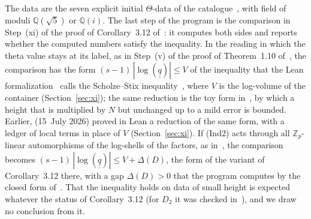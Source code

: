 \documentclass[11pt,a4paper]{article}
\newcommand{\qq}{\underline{\underline{q}}{}}
\newcommand{\Q}{\mathbb{Q}}
\newcommand{\Z}{\mathbb{Z}}
\begin{document}
The data are the seven explicit initial $\Theta$-data of the catalogue~\cite{Cat}, with field of moduli
$\Q(\sqrt5)$ or $\Q(i)$. The last step of the program is the comparison in Step~(xi) of the proof of
Corollary~3.12 of~\cite{IUT3}: it computes both sides and reports whether the computed numbers satisfy the
inequality. In the reading in which the theta value stays at its label, as in Step~(v) of the proof of
Theorem~1.10 of~\cite{IUT4}, the comparison has the form $(s-1)\,|\log(\qq)|\le V$ of the inequality that the
Lean formalization~\cite{LANAiut} calls the Scholze--Stix inequality~\cite{SS}, where $V$ is the log-volume of
the container (Section~\ref{sec:xi}); the same reduction is the toy form in~\cite[\S3]{Formal}, by which a height that
is multiplied by $N$ but unchanged up to a mild error is bounded. Earlier, \cite{Takkun} (15~July 2026) proved in Lean
a reduction of the same form, with a ledger of local terms in place of $V$ (Section~\ref{sec:xi}). If (Ind2) acts
through all $\Z_p$-linear automorphisms of the log-shells of the factors, as in~\cite{LANAiut}, the comparison becomes
$(s-1)\,|\log(\qq)|\le V+\Delta(D)$, the form of the variant of Corollary~3.12 there, with a gap $\Delta(D)>0$ that
the program computes by the closed form of~\cite{Gap}. That the inequality holds on data of small height is
expected whatever the status of Corollary~3.12 (for $D_2$ it was checked in~\cite[\S5]{Cat}), and we draw no
conclusion from it.
\end{document}
